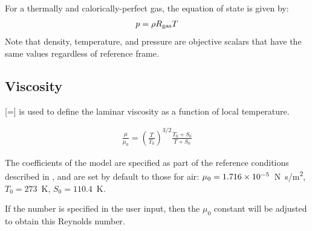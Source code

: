 
For a thermally and calorically-perfect gas, the equation of state
is given by:
\begin{gather}
  \label{EQN:EqOfState}
  p = \rho R_{\textrm{gas}} T
\end{gather}
%
Note that density, temperature, and pressure are objective scalars
that have the same values regardless of reference frame.



\subsection{Viscosity}


[=]
is used to define the laminar viscosity as a function of local temperature.


\begin{gather}
  \label{EQN:Viscosity_Sutherland}
  \frac{\mu}{\mu_0} = \left( \frac{T}{T_0} \right) ^{3/2}
                      \frac{T_0 + S_0}{T + S_0}
\end{gather}


The coefficients of the model are specified as part of the reference
conditions described in ,
and are set by default to those for air:
%
$\mu_0 = \scinum{1.716}{-5}  $~\unit{N.s/m^2},
$  T_0 = 273                 $~\unit{K},
$  S_0 = 110.4               $~\unit{K}.

\NOTE
If the  number is specified in the user input,
then the $\mu_0$ constant will be adjusted to obtain this Reynolds number.




